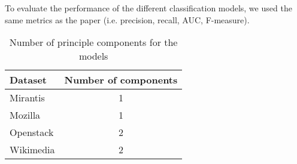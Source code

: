 To evaluate the performance of the different classification models, we used the
same metrics as the paper (i.e. precision, recall, AUC, F-measure).

\begin{table}[h]
  \caption{Number of principle components for the models}
  \label{table:pca}
    \centering
    \begin{tabular}{|l|c|}
    \hline
        Dataset   & Number of components \\ \hline
        Mirantis  & 1 \\ \hline
        Mozilla   & 1 \\ \hline
        Openstack & 2 \\ \hline
        Wikimedia & 2 \\ \hline
    \end{tabular}
\end{table}
